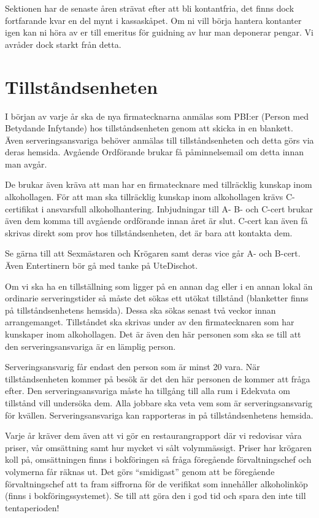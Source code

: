\documentclass[10pt]{article}
\begin{document}
    Sektionen har de senaste åren strävat efter att bli kontantfria, det finns dock fortfarande kvar en del mynt i kassaskåpet. Om ni vill börja hantera kontanter igen kan ni höra av er till emeritus för guidning av hur man deponerar pengar. Vi avråder dock starkt från detta. 
    
    \section{Tillståndsenheten}
    
    I början av varje år ska de nya firmatecknarna anmälas som PBI:er (Person med Betydande Infytande) hos tillståndsenheten genom att skicka in en blankett. Även serveringsansvariga behöver anmälas till tillståndsenheten och detta görs via deras hemsida. Avgående Ordförande brukar få påminnelsemail om detta innan man avgår.
    
    De brukar även kräva att man har en firmatecknare med tillräcklig kunskap inom alkohollagen. För att man ska tillräcklig kunskap inom alkohollagen krävs C-certifikat i ansvarsfull alkoholhantering. Inbjudningar till A- B- och C-cert brukar även dem komma till avgående ordförande innan året är slut. C-cert kan även få skrivas direkt som prov hos tillståndsenheten, det är bara att kontakta dem.
    
    Se gärna till att Sexmästaren och Krögaren samt deras vice går A- och B-cert. Även Entertinern bör gå med tanke på UteDischot.
    
    Om vi ska ha en tillställning som ligger på en annan dag eller i en annan lokal än ordinarie serveringstider så måste det sökas ett utökat tillstånd (blanketter finns på tillståndsenhetens hemsida). Dessa ska sökas senast två veckor innan arrangemanget. Tillståndet ska skrivas under av den firmatecknaren som har kunskaper inom alkohollagen. Det är även den här personen som ska se till att den serveringsansvariga är en lämplig person.
    
    Serveringsansvarig får endast den person som är minst 20 vara. När tillståndsenheten kommer på besök är det den här personen de kommer att fråga efter. Den serveringsansvariga måste ha tillgång till alla rum i Edekvata om tillstånd vill undersöka dem. Alla jobbare ska veta vem som är serveringsansvarig för kvällen. Serveringsansvariga kan rapporteras in på tillståndsenhetens hemsida.
    
    Varje år kräver dem även att vi gör en restaurangrapport där vi redovisar våra priser, vår omsättning samt hur mycket vi sålt volymmässigt. Priser har krögaren koll på, omsättningen finns i bokföringen så fråga föregående förvaltningschef och volymerna får räknas ut. Det görs ``smidigast'' genom att be föregående förvaltningschef att ta fram siffrorna för de verifikat som innehåller alkoholinköp (finns i bokföringssystemet). Se till att göra den i god tid och spara den inte till tentaperioden!
    
\end{document}
